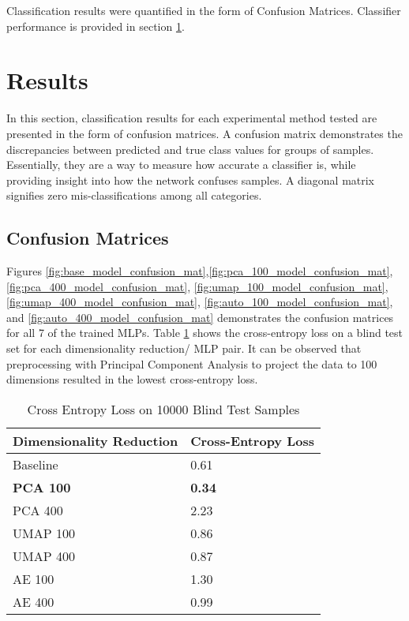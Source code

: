 \documentclass[conference]{IEEEtran}
\begin{document}
Classification results were quantified in the form of Confusion Matrices.  Classifier performance is provided in section \ref{Results}.



\section{Results} \label{Results}

In this section, classification results for each experimental method tested are presented in the form of confusion matrices.  A confusion matrix demonstrates the discrepancies between predicted and true class values for groups of samples.  Essentially, they are a way to measure how accurate a classifier is, while providing insight into how the network confuses samples.  A diagonal matrix signifies zero mis-classifications among all categories.

\subsection{Confusion Matrices}
Figures \ref{fig:base_model_confusion_mat},\ref{fig:pca_100_model_confusion_mat},\ref{fig:pca_400_model_confusion_mat}, \ref{fig:umap_100_model_confusion_mat}, \ref{fig:umap_400_model_confusion_mat}, \ref{fig:auto_100_model_confusion_mat}, and \ref{fig:auto_400_model_confusion_mat} demonstrates the confusion matrices for all 7 of the trained MLPs.  Table \ref{tab:cross_entropy_loss_table} shows the cross-entropy loss on a blind test set for each dimensionality reduction/ MLP pair.  It can be observed that preprocessing with Principal Component Analysis to project the data to 100 dimensions resulted in the lowest cross-entropy loss.

\begin{table}[h!]
	\caption{Cross Entropy Loss on 10000 Blind Test Samples}
	\label{tab:cross_entropy_loss_table}
	\normalsize
	\begin{center}
		\begin{tabularx}{0.5\textwidth}{ |X|X| } 
			\hline
			\textbf{Dimensionality Reduction}  & \textbf{Cross-Entropy Loss} \\
			\hline
			Baseline & 0.61 \\
			\hline
			\textbf{PCA 100} & \textbf{0.34} \\
			\hline
			PCA 400 & 2.23 \\
			\hline
			UMAP 100 & 0.86 \\
			\hline
			UMAP 400 & 0.87 \\
			\hline
			AE 100 & 1.30 \\
			\hline
			AE 400 & 0.99 \\
			\hline
		\end{tabularx}
	\end{center}
\end{table} 
\end{document}
